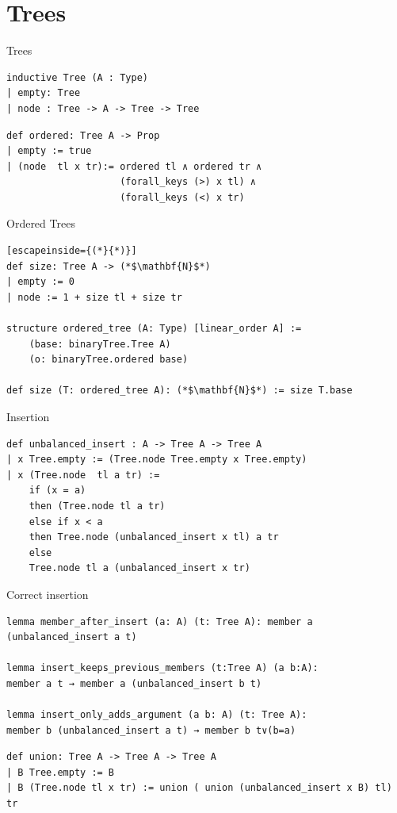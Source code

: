 \documentclass[aspectratio=169]{beamer}
\begin{document}
    \section{Trees}
    \begin{frame}[fragile]{Trees}
        \begin{lstlisting}
inductive Tree (A : Type)
| empty: Tree 
| node : Tree -> A -> Tree -> Tree
        \end{lstlisting}
    \pause
    \begin{lstlisting}[caption=ordered from {\cite{avl}}]
def ordered: Tree A -> Prop
| empty := true
| (node  tl x tr):= ordered tl ∧ ordered tr ∧ 
                    (forall_keys (>) x tl) ∧ 
                    (forall_keys (<) x tr)

    \end{lstlisting}
    \end{frame}
    \begin{frame}[fragile]{Ordered Trees}
        \begin{lstlisting}[escapeinside={(*}{*)}]
def size: Tree A -> (*$\mathbf{N}$*)
| empty := 0
| node := 1 + size tl + size tr

structure ordered_tree (A: Type) [linear_order A] := 
    (base: binaryTree.Tree A) 
    (o: binaryTree.ordered base)

def size (T: ordered_tree A): (*$\mathbf{N}$*) := size T.base
        \end{lstlisting}

    
    \end{frame}
    \begin{frame}[fragile]{Insertion}
        \begin{lstlisting}[aboveskip=0pt, belowskip=0pt]
def unbalanced_insert : A -> Tree A -> Tree A
| x Tree.empty := (Tree.node Tree.empty x Tree.empty)
| x (Tree.node  tl a tr) := 
    if (x = a)
    then (Tree.node tl a tr)
    else if x < a 
    then Tree.node (unbalanced_insert x tl) a tr
    else
    Tree.node tl a (unbalanced_insert x tr)
        \end{lstlisting}
    \end{frame}
    \begin{frame}[fragile]{Correct insertion}
        \begin{lstlisting}[aboveskip=0pt, belowskip=0pt]
lemma member_after_insert (a: A) (t: Tree A): member a (unbalanced_insert a t)

lemma insert_keeps_previous_members (t:Tree A) (a b:A): 
member a t → member a (unbalanced_insert b t)

lemma insert_only_adds_argument (a b: A) (t: Tree A): 
member b (unbalanced_insert a t) → member b t∨(b=a)
        \end{lstlisting}
    \pause
    \begin{lstlisting}[aboveskip=0pt, belowskip=0pt]
def union: Tree A -> Tree A -> Tree A
| B Tree.empty := B
| B (Tree.node tl x tr) := union ( union (unbalanced_insert x B) tl) tr

    \end{lstlisting}

    \end{frame}
\end{document}
